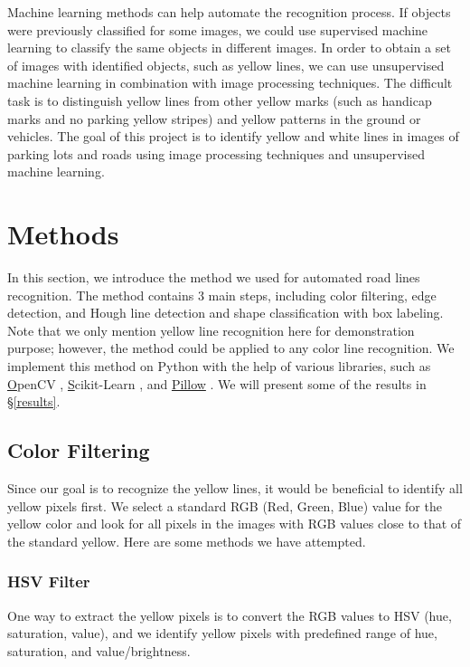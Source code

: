 \documentclass{m2pi}
\begin{document}
Machine learning methods can help automate the recognition process. If objects were previously classified for some images, we could use supervised machine learning to classify the same objects in different images. In order to obtain a set of images with identified objects, such as yellow lines, we can use unsupervised machine learning in combination with image processing techniques. The difficult task is to distinguish yellow lines from other yellow marks (such as handicap marks and no parking yellow stripes) and yellow patterns in the ground or vehicles. The goal of this project is to identify yellow and white lines in images of parking lots and roads using image processing techniques and unsupervised machine learning.

\section{Methods}\label{methods}
In this section, we introduce the method we used for automated 
road lines recognition. The method contains 3 main steps, including
color filtering, edge detection, and Hough line detection and 
shape classification with box labeling. 
Note that we only mention yellow line recognition here for
demonstration purpose; however, the method could be applied 
to any color line recognition. 
We implement this method on Python with the help of various 
libraries, such as \href{v}OpenCV \cite{opencv_library}, 
\href{v} Scikit-Learn \cite{scikit-learn}, and \href{v}{Pillow} \cite{clark2015pillow}.
We will present some of the results in \S \ref{results}.



\subsection{Color Filtering}

Since our goal is to recognize the yellow lines, it would be beneficial to identify all yellow pixels first. We select a standard RGB (Red, Green, Blue) value for the yellow color and look for all pixels in the images with RGB values close to that of the standard yellow. Here are some methods we have attempted.

\subsubsection{HSV  Filter}

One way to extract the yellow pixels is to convert the RGB values to HSV (hue, saturation, value), and we identify yellow pixels with predefined range of hue, saturation, and value/brightness.
\end{document}

